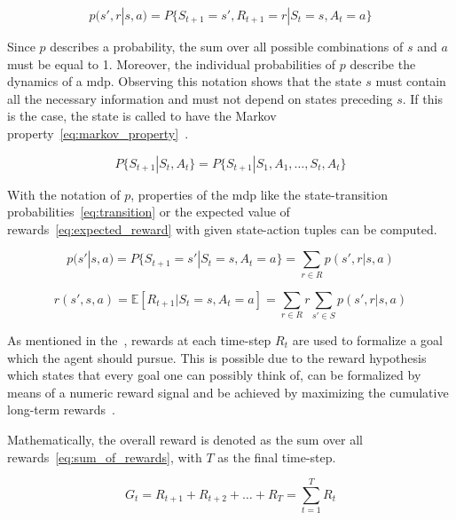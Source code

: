 \documentclass[draft,final]{vutinfth} %
\begin{document}
    \begin{equation}
        p(s',r|s,a) = P\{S_{t+1}=s', R_{t+1}=r | S_t=s, A_t=a\}\label{eq:distribution}
    \end{equation}

    Since $p$ describes a probability, the sum over all possible combinations of $s$ and $a$ must be equal to 1.
    Moreover, the individual probabilities of $p$ describe the dynamics of a \gls{mdp}.
    Observing this notation shows that the state $s$ must contain all the necessary information and must not depend on states preceding $s$.
    If this is the case, the state is called to have the Markov property~\eqref{eq:markov_property}~\citep{francois-lavet_introduction_2018}.

    \begin{equation}
        P\{S_{t+1}|S_t,A_t\} = P\{S_{t+1}|S_1,A_1,\ldots,S_t,A_t\} \label{eq:markov_property}
    \end{equation}

    With the notation of $p$, properties of the \gls{mdp} like the state-transition probabilities~\eqref{eq:transition} or the expected value of rewards~\eqref{eq:expected_reward} with given state-action tuples can be computed.

    \begin{equation}
        p(s'|s,a) = P\{S_{t+1}=s'| S_t=s, A_t=a\} = \sum_{r \in \mathit{R}} p(s',r | s,a) \label{eq:transition}
    \end{equation}

    \begin{equation}
        r(s',s,a) = \mathbb{E}[R_{t+1} | S_t=s, A_t=a] = \sum_{r\in \mathit{R}} r \sum_{s' \in \mathit{S}} p(s',r | s,a) \label{eq:expected_reward}
    \end{equation}

    As mentioned in the~, rewards at each time-step $R_t$ are used to formalize a goal which the agent should pursue.
    This is possible due to the reward hypothesis which states that every goal one can possibly think of, can be formalized by means of a numeric reward signal and be achieved by maximizing the cumulative long-term rewards~\citep{sutton_reinforcement_2018}.

    Mathematically, the overall reward is denoted as the sum over all rewards~\eqref{eq:sum_of_rewards}, with $T$ as the final time-step.

    \begin{equation}
        G_t=R_{t+1} + R_{t+2}+ \ldots + R_{T}  =\sum_{t=1}^{T} R_{t}\label{eq:sum_of_rewards}
    \end{equation}
\end{document}
